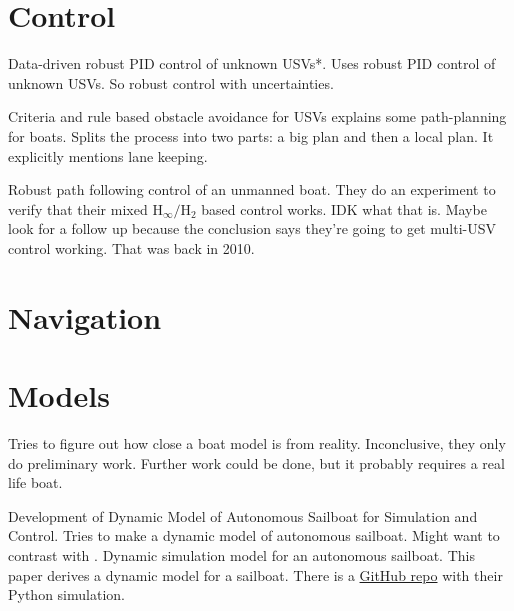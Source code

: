\documentclass[conference]{IEEEtran}
\begin{document}
\section{Control}
\cite{Nan2020} Data-driven robust PID control of unknown USVs*. Uses robust PID control of unknown USVs. So robust control with uncertainties.

\cite{Tan2010} Criteria and rule based obstacle avoidance for USVs explains some path-planning for boats. Splits the process into two parts: a big plan and then a local plan. It explicitly mentions lane keeping.

\cite{Yu2010} Robust path following control of an unmanned boat. They do an experiment to verify that their mixed \(\mathrm{H}_\infty / \mathrm{H}_2\) based control works. IDK what that is. Maybe look for a follow up because the conclusion says they're going to get multi-USV control working. That was back in 2010.

\section{Navigation}

\section{Models}
\cite{Huang2017} Tries to figure out how close a boat model is from reality. Inconclusive, they only do preliminary work. Further work could be done, but it probably requires a real life boat.

\cite{Setiawan2020} Development of Dynamic Model of Autonomous Sailboat for Simulation and Control. Tries to make a dynamic model of autonomous sailboat. Might want to contrast with \cite{Buehler2018}.
\cite{Buehler2018} Dynamic simulation model for an autonomous sailboat. This paper derives a dynamic model for a sailboat. There is a \href{https://github.com/simonkohaut/stda-sailboat-simulator/tree/master/src}{GitHub repo} with their Python simulation.


\end{document}
